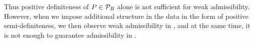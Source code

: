 \begin{comment}
\begin{proof}
Fix an arbitrary $\alpha>0$. We show that there exists $P\in \P$ such that $\rho_\alpha(P)<0$.
For $\epsilon \in (0,1/2)$ let $P=(P^V,P^M)$ be the distribution such that $P^M$ is supported on $\{-I,I\}$ and takes on the value of $I$ with probability $1/2+\epsilon$. Then $A_P = 2\epsilon I \succ 0$, hence $P\in \P_1$. Further, $Q_P = I$.
Hence, $\rhos{P} = 4\epsilon-\alpha$. Hence, if $\epsilon<\alpha/4$, $\rho_\alpha(P)<0$.
\end{proof}
\end{comment}

\begin{comment}
\begin{proof}
Take any $P\in \P_{\text{PSD}}$ and let $H\sim P$.
Consider the SVD of $H$: $H = U \Lambda U^\top$ where $U$ is orthonormal and $\Lambda$ is diagonal with
nonnegative elements. Note that $\Lambda \preceq B\, \I$ and thus $\Lambda^2 \preceq B \Lambda$.
Then for any $x\in \R^d$, $x^\top H^\top H x = x^\top U \Lambda^2 U^\top x \le B x^\top U \Lambda U^\top x = B x^\top H x$.
Taking expectations we find that $x^\top Q_P x \le B x^\top H_P x$.
Hence, $\rho_\alpha(P) = 2 x^\top H_P x - \alpha x^\top Q_P x \ge (2- \alpha B ) \,x^\top H_P x $.
Thus, for any $\alpha<2/B$, $\rho_\alpha(P)>0$.
\end{proof}
\end{comment}
Thus  positive definiteness of $P\in \P_B$ alone is not sufficient for weak admissibility. However, when we impose additional structure in the data in the form of positive semi-definiteness,  we then observe weak admissibility in , and at the same time, it is not enough to guarantee admissibility in .
\begin{comment}
\FloatBarrier
\begin{table}[H]
\begin{tabular}{|c|c|c|c|}\hline
Problem Class & Weak Admissible & Admissible &Example \\ \hline
$\P_B$ &\ding{53} &\ding{53} & RL\\\hline
$\P_{\text{PSD},B}$ &\ding{51} &\ding{53} & SGD for Linear Regression\\\hline
$\P_{\text{PD},B}$ &\ding{51} &\ding{51} & SGD for Linear Regression with regularization\\\hline
\end{tabular}
\end{table}
\end{comment}
